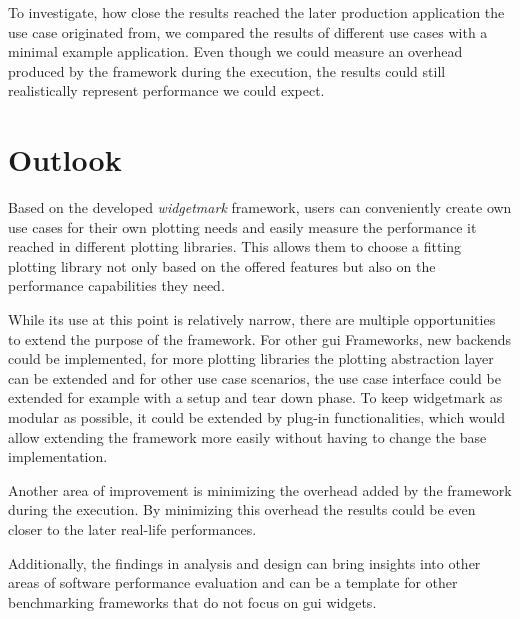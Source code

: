 To investigate, how close the results reached the later production application
the use case originated from, we compared the results of different use cases
with a minimal example application. Even though we could measure an overhead
produced by the framework during the execution, the results could still
realistically represent performance we could expect.

\section{Outlook}
\label{sec:Conclusion:Outlook}

Based on the developed \emph{widgetmark} framework, users can conveniently
create own use cases for their own plotting needs and easily measure the
performance it reached in different plotting libraries. This allows them to
choose a fitting plotting library not only based on the offered features but
also on the performance capabilities they need.

While its use at this point is relatively narrow, there are multiple
opportunities to extend the purpose of the framework. For other \gls{gui}
Frameworks, new backends could be implemented, for more plotting libraries the
plotting abstraction layer can be extended and for other use case scenarios, the
use case interface could be extended for example with a setup and tear down
phase.  To keep widgetmark as modular as possible, it could be extended by
plug-in functionalities, which would allow extending the framework more easily
without having to change the base implementation.

Another area of improvement is minimizing the overhead added by the framework
during the execution. By minimizing this overhead the results could be even
closer to the later real-life performances.

Additionally, the findings in analysis and design can bring insights into other
areas of software performance evaluation and can be a template for other
benchmarking frameworks that do not focus on \gls{gui} widgets.
